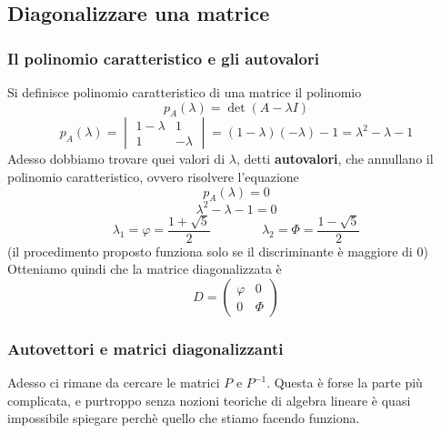 \documentclass{article}     %
\begin{document}
\subsection{Diagonalizzare una matrice}
\subsubsection{Il polinomio caratteristico e gli autovalori}
Si definisce polinomio caratteristico di una matrice il polinomio
\[p_A(\lambda) = \det\left( A -\lambda I \right)\]
\[p_A(\lambda) =\begin{vmatrix} 1 -\lambda&1\\1&-\lambda \end{vmatrix} = (1 -\lambda)( -\lambda) - 1 =\lambda^2 -\lambda - 1\]
Adesso dobbiamo trovare quei valori di $\lambda$, detti \textbf{autovalori}, che annullano il polinomio caratteristico, ovvero risolvere l'equazione 
\[p_A(\lambda) = 0\]
\[\lambda^2 -\lambda - 1 = 0\] 
\[\lambda_1 =\varphi =\frac{1 + \sqrt{5}}{2}\qquad\qquad\lambda_2 =\Phi =\frac{1 - \sqrt{5}}{2}\]
(il procedimento proposto funziona solo se il discriminante è maggiore di 0)
Otteniamo quindi che la matrice diagonalizzata è
\[D =\begin{pmatrix} \varphi &0\\0&\Phi \end{pmatrix} \]
\subsubsection{Autovettori e matrici diagonalizzanti}
Adesso ci rimane da cercare le matrici $P$ e $P^{-1}$. Questa è forse la parte più complicata, e purtroppo senza nozioni teoriche di algebra lineare è quasi impossibile spiegare perchè quello che stiamo facendo funziona.
\end{document}
